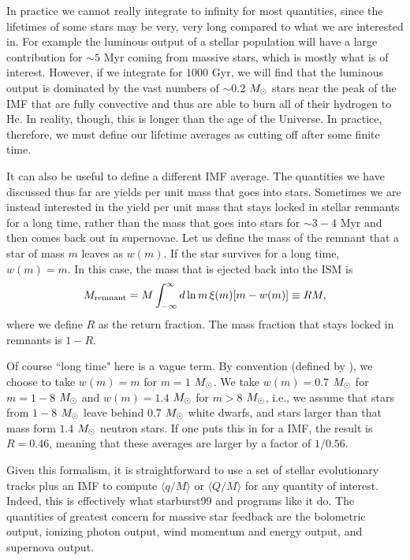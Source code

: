 In practice we cannot really integrate to infinity for most quantities, since the lifetimes of some stars may be very, very long compared to what we are interested in. For example the luminous output of a stellar population will have a large contribution for $\sim 5$ Myr coming from massive stars, which is mostly what is of interest. However, if we integrate for $1000$ Gyr, we will find that the luminous output is dominated by the vast numbers of $\sim 0.2$ $M_{\odot}$ stars near the peak of the IMF that are fully convective and thus are able to burn all of their hydrogen to He. In reality, though, this is longer than the age of the Universe. In practice, therefore, we must define our lifetime averages as cutting off after some finite time.

It can also be useful to define a different IMF average. The quantities we have discussed thus far are yields per unit mass that goes into stars. Sometimes we are instead interested in the yield per unit mass that stays locked in stellar remnants for a long time, rather than the mass that goes into stars for $\sim 3-4$ Myr and then comes back out in supernovae. Let us define the mass of the remnant that a star of mass $m$ leaves as $w(m)$. If the star survives for a long time, $w(m) = m$. In this case, the mass that is ejected back into the ISM is
\begin{equation}
M_{\rm remnant} = M \int_{-\infty}^{\infty} d\ln m \, \xi(m) [m - w(m)] \equiv R M,
\end{equation}
where we define $R$ as the return fraction. The mass fraction that stays locked in remnants is $1-R$.

Of course ``long time" here is a vague term. By convention (defined by \citealt{tinsley80a}), we choose to take $w(m) = m$ for $m=1$ $M_{\odot}$. We take $w(m) = 0.7$ $M_{\odot}$ for $m=1-8$ $M_{\odot}$ and $w(m) = 1.4$ $M_{\odot}$ for $m>8$ $M_{\odot}$, i.e., we assume that stars from $1-8$ $M_{\odot}$ leave behind $0.7$ $M_{\odot}$ white dwarfs, and stars larger than that mass form $1.4$ $M_{\odot}$ neutron stars. If one puts this in for a \citet{chabrier05a} IMF, the result is $R=0.46$, meaning that these averages are larger by a factor of $1/0.56$.

Given this formalism, it is straightforward to use a set of stellar evolutionary tracks plus an IMF to compute $\langle q/M\rangle$ or $\langle Q/M\rangle$ for any quantity of interest. Indeed, this is effectively what starburst99 \citep{leitherer99a} and programs like it do. The quantities of greatest concern for massive star feedback are the bolometric output, ionizing photon output, wind momentum and energy output, and supernova output.


